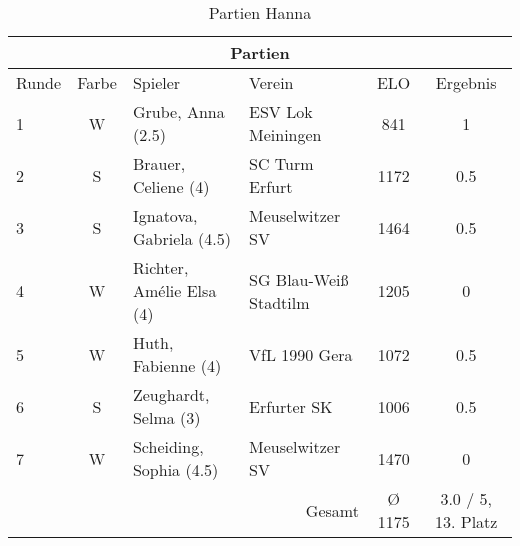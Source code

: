 \begin{table}[H]
\centering
\begin{tabular}{|l|c|l|l|c|c|}
\hline
\multicolumn{6}{|c|}{Partien} \\
\hline
Runde & Farbe & Spieler & Verein & ELO & Ergebnis \\
\hline
1 & W & Grube, Anna (2.5) & ESV Lok Meiningen & 841 & 1 \\
2 & S & Brauer, Celiene (4) & SC Turm Erfurt & 1172 & 0.5 \\
3 & S & Ignatova, Gabriela (4.5) & Meuselwitzer SV & 1464 & 0.5 \\
4 & W & Richter, Amélie Elsa (4) & SG Blau-Weiß Stadtilm & 1205 & 0 \\
5 & W & Huth, Fabienne (4) & VfL 1990 Gera & 1072 & 0.5 \\
6 & S & Zeughardt, Selma (3) & Erfurter SK & 1006 & 0.5 \\
7 & W & Scheiding, Sophia (4.5) & Meuselwitzer SV & 1470 & 0 \\
\hline
\multicolumn{4}{|r|}{Gesamt} & Ø 1175 & 3.0 / 5, 13. Platz \\

\hline

\end{tabular}
\caption{Partien Hanna}
\end{table}
